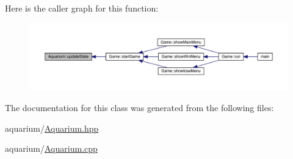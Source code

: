 Here is the caller graph for this function\+:
\nopagebreak
\begin{figure}[H]
\begin{center}
\leavevmode
\includegraphics[width=350pt]{class_aquarium_ac9fc0451e82c808d91a32a2e23e9f18e_icgraph}
\end{center}
\end{figure}


The documentation for this class was generated from the following files\+:\begin{DoxyCompactItemize}
\item 
aquarium/\mbox{\hyperlink{_aquarium_8hpp}{Aquarium.\+hpp}}\item 
aquarium/\mbox{\hyperlink{_aquarium_8cpp}{Aquarium.\+cpp}}\end{DoxyCompactItemize}
